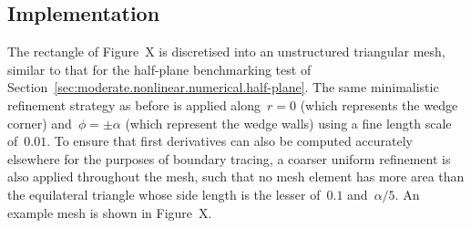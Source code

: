 \subsection{Implementation}
\label{sec:small.numerical.implementation}

The rectangle of Figure~X %
is discretised into an unstructured triangular mesh,
similar to that for the half-plane benchmarking test
of Section~\ref{sec:moderate.nonlinear.numerical.half-plane}.
The same minimalistic refinement strategy as before is applied
along~$r = 0$ (which represents the wedge corner)
and~$\phi = \pm\alpha$ (which represent the wedge walls)
using a fine length scale of~$0.01$.
To ensure that first derivatives
can also be computed accurately elsewhere
for the purposes of boundary tracing,
a coarser uniform refinement is also applied throughout the mesh,
such that no mesh element has more area than the equilateral triangle
whose side length is the lesser of~$0.1$ and~$\alpha / 5$.
An example mesh is shown in
Figure~X\@. %
